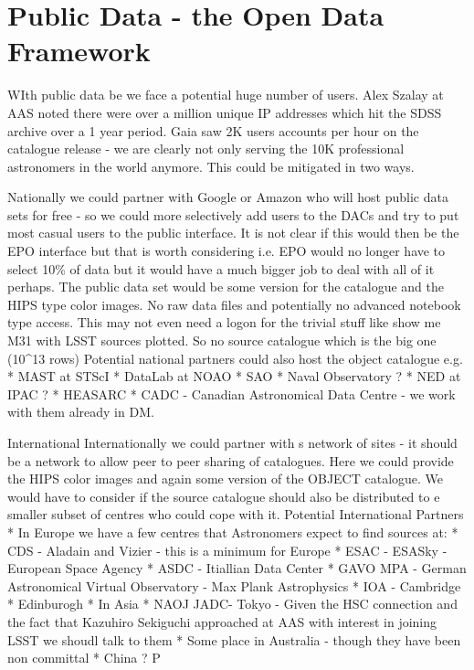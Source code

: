 

\section{Public Data - the Open Data Framework}


WIth public data be we face a potential huge number of users.
Alex Szalay at AAS noted there were over a million unique IP addresses which hit the SDSS archive over a 1 year period.  Gaia saw 2K users accounts per hour on the catalogue release - we are clearly not only serving the 10K professional astronomers in the world anymore.
This could be mitigated in two ways.


Nationally we could partner with Google or Amazon who will host public data sets for free - so we could more selectively add users to the DACs and try to put most casual users to the public interface. It is not clear if this would then be the EPO interface but that is worth considering i.e. EPO would no longer have to select 10\% of data but it would have a much bigger job to deal with all of it perhaps.
The public data set would be some version for the catalogue and the HIPS type color images. No raw data files and potentially no advanced notebook type access. This may not even need a logon for the trivial stuff like show me M31 with LSST sources plotted.  So no source catalogue which is the big one (10^13 rows)
Potential national partners  could also host the object catalogue e.g.
* MAST at STScI
* DataLab at NOAO
* SAO
* Naval Observatory ?
* NED at IPAC ?
* HEASARC
* CADC - Canadian Astronomical Data Centre - we work with them already in DM.

International
Internationally we could partner with s network of sites - it should be a network to allow peer to peer sharing of catalogues. Here we could provide the HIPS color images and again some version of the OBJECT catalogue. We would have to consider if the source catalogue should also be distributed to e smaller subset of centres who could cope with it.
Potential International Partners
* In Europe we have a few centres that Astronomers expect to find sources at:
    * CDS  - Aladain and Vizier - this is a minimum for Europe
    * ESAC - ESASky - European Space Agency
    * ASDC - Itiallian Data Center
    * GAVO MPA - German Astronomical Virtual Observatory - Max Plank Astrophysics
    * IOA - Cambridge
    * Edinburogh
* In Asia
    * NAOJ JADC- Tokyo - Given the HSC connection and the fact that Kazuhiro Sekiguchi approached at AAS with interest in joining LSST we shoudl talk to them
    * Some place in Australia - though they have been non committal
    * China ?
P

